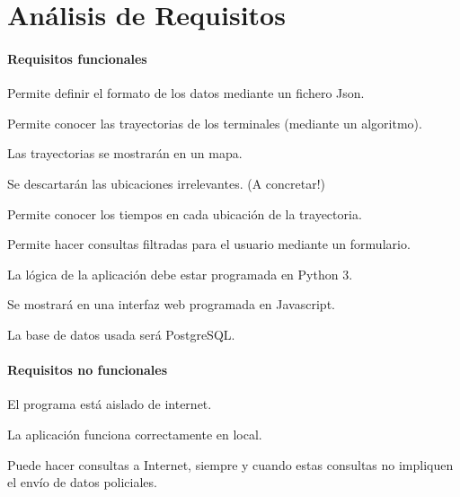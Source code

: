 \section{Análisis de Requisitos\label{SEC:ANALISIS}}
  \paragraph{Requisitos funcionales}
  
  \begin{functional}
    \item Permite definir el formato de los datos mediante un fichero Json.
    
    \item Permite  conocer las trayectorias de los terminales (mediante un algoritmo).
    \begin{functional}
      \item Las trayectorias se mostrarán en un mapa.
      \item Se descartarán las ubicaciones irrelevantes. (A concretar!)
    \end{functional}
    \item Permite conocer los tiempos en cada ubicación de la trayectoria.
    
    \item Permite hacer consultas filtradas para el usuario mediante un formulario.
    
    \item La lógica de la aplicación debe estar programada en Python 3.
    
    \item Se mostrará en una interfaz web programada en Javascript.
    
    \item La base de datos usada será PostgreSQL.        
  \end{functional}
  
  \paragraph{Requisitos no funcionales}
  
  \begin{nonfunctional}
    \item El programa está aislado de internet.
    \begin{nonfunctional}
      \item La aplicación funciona correctamente en local.
      \item Puede hacer consultas a Internet, siempre y cuando estas consultas no impliquen el envío de datos policiales.
    \end{nonfunctional}
  \end{nonfunctional}